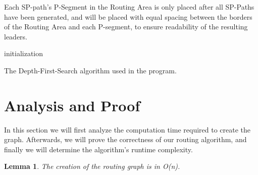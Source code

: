 \documentclass[11pt,a4paper]{vutinfth}
\newtheorem{lemma}{Lemma}
\begin{document}
Each SP-path's P-Segment in the Routing Area is only placed after all SP-Paths have been generated, and will be placed with equal spacing between the borders of the Routing Area and each P-segment, to ensure readability of the resulting leaders.

\begin{algorithm}

\DontPrintSemicolon
{}



initialization\;
\caption{The Depth-First-Search algorithm used in the program.}
\label{alg:DFS}
\end{algorithm}



\section{Analysis and Proof}

In this section we will first analyze the computation time required to create the graph. Afterwards, we will prove the correctness of our routing algorithm, and finally we will determine the algorithm's runtime complexity.

%
\begin{lemma}
	The creation of the routing graph is in O(n).
	\label{lem:GraphCreat}
\end{lemma}
\end{document}

